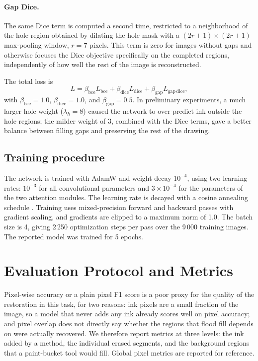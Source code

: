 \documentclass[pdflatex,sn-mathphys-num]{sn-jnl}%
\begin{document}
\paragraph{Gap Dice.} The same Dice term is computed a second time, restricted to a
neighborhood of the hole region obtained by dilating the hole mask with a
$(2r+1)\times(2r+1)$ max-pooling window, $r=7$ pixels. This term is zero for images
without gaps and otherwise focuses the Dice objective specifically on the completed
regions, independently of how well the rest of the image is reconstructed.

The total loss is
\begin{equation}
  L = \beta_{\mathrm{bce}} L_{\mathrm{bce}} + \beta_{\mathrm{dice}} L_{\mathrm{dice}}
  + \beta_{\mathrm{gap}} L_{\mathrm{gap\,dice}},
\end{equation}
with $\beta_{\mathrm{bce}} = 1.0$, $\beta_{\mathrm{dice}} = 1.0$, and
$\beta_{\mathrm{gap}} = 0.5$. In preliminary experiments, a much larger hole weight
($\lambda_h = 8$) caused the network to over-predict ink outside the hole regions;
the milder weight of 3, combined with the Dice terms, gave a better balance between
filling gaps and preserving the rest of the drawing.

\subsection{Training procedure}

The network is trained with AdamW \citep{loshchilov2019adamw} and weight decay
$10^{-4}$, using two learning rates: $10^{-3}$ for all convolutional parameters and
$3\times 10^{-4}$ for the parameters of the two attention modules. The learning
rate is decayed with a cosine annealing schedule \citep{loshchilov2017sgdr}. Training uses mixed-precision forward and backward passes
with gradient scaling, and gradients are clipped to a maximum norm of 1.0. The batch
size is 4, giving 2\,250 optimization steps per pass over the 9\,000 training images.
The reported model was trained for 5 epochs.

\section{Evaluation Protocol and Metrics}
\label{sec:metrics}

Pixel-wise accuracy or a plain pixel F1 score is a poor proxy for the quality of the
restoration in this task, for two reasons: ink pixels are a small fraction of the
image, so a model that never adds any ink already scores well on pixel accuracy;
and pixel overlap does not directly say whether the regions that flood fill depends
on were actually recovered. We therefore report metrics at three levels: the ink
added by a method, the individual erased segments, and the background regions that a
paint-bucket tool would fill. Global pixel metrics are reported for reference.
\end{document}
